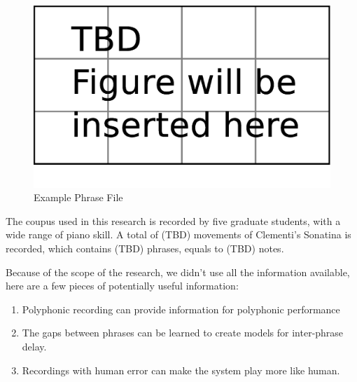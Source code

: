 
\begin{figure}[tp]
   \begin{center}
      \includegraphics[width=\textwidth]{fig/TBDFigure}

   \end{center}
   \caption{Example Phrase File}
   \label{fig:phrase}
\end{figure}


The coupus used in this research is recorded by five graduate students, with a wide range of piano skill. A total of (TBD) movements of Clementi's Sonatina is recorded, which contains (TBD) phrases, equals to (TBD) notes. 

Because of the scope of the research, we didn't use all the information available, here are a few pieces of potentially useful information:
\begin{enumerate}
   \item Polyphonic recording can provide information for polyphonic performance
   \item The gaps between phrases can be learned to create models for inter-phrase delay.
   \item Recordings with human error can make the system play more like human.
\end{enumerate}

